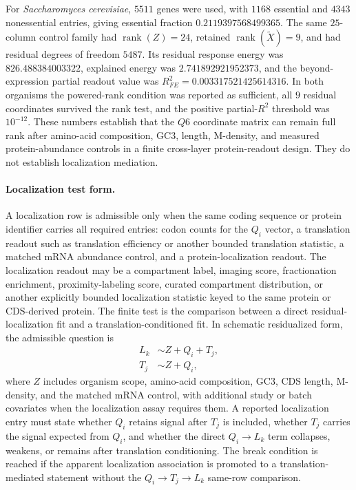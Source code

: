 For \emph{Saccharomyces cerevisiae}, $5511$ genes were used, with $1168$ essential and $4343$ nonessential entries, giving essential fraction $0.2119397568499365$.  The same $25$-column control family had $\operatorname{rank}(Z)=24$, retained $\operatorname{rank}(\widetilde X)=9$, and had residual degrees of freedom $5487$.  Its residual response energy was $826.488384003322$, explained energy was $2.741892921952373$, and the beyond-expression partial readout value was $R^2_{FE}=0.003317521425614316$.  In both organisms the powered-rank condition was reported as sufficient, all $9$ residual coordinates survived the rank test, and the positive partial-$R^2$ threshold was $10^{-12}$.  These numbers establish that the $Q6$ coordinate matrix can remain full rank after amino-acid composition, GC3, length, M-density, and measured protein-abundance controls in a finite cross-layer protein-readout design.  They do not establish localization mediation.

\paragraph{Localization test form.}
A localization row is admissible only when the same coding sequence or protein identifier carries all required entries: codon counts for the $Q_i$ vector, a translation readout such as translation efficiency or another bounded translation statistic, a matched mRNA abundance control, and a protein-localization readout.  The localization readout may be a compartment label, imaging score, fractionation enrichment, proximity-labeling score, curated compartment distribution, or another explicitly bounded localization statistic keyed to the same protein or CDS-derived protein.  The finite test is the comparison between a direct residual-localization fit and a translation-conditioned fit.  In schematic residualized form, the admissible question is
$$
\begin{aligned}
  L_k &\sim Z + Q_i + T_j,\\
  T_j &\sim Z + Q_i,
\end{aligned}
$$
where $Z$ includes organism scope, amino-acid composition, GC3, CDS length, M-density, and the matched mRNA control, with additional study or batch covariates when the localization assay requires them.  A reported localization entry must state whether $Q_i$ retains signal after $T_j$ is included, whether $T_j$ carries the signal expected from $Q_i$, and whether the direct $Q_i \to L_k$ term collapses, weakens, or remains after translation conditioning.  The break condition is reached if the apparent localization association is promoted to a translation-mediated statement without the $Q_i \to T_j \to L_k$ same-row comparison.

